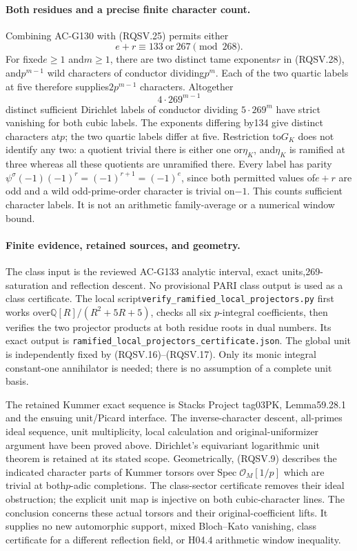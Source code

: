 \paragraph{Both residues and a precise finite character count.}
Combining AC-G130 with (RQSV.25) permits either
\[
                         e+r\equiv133\ \text{or}\ 267\pmod{268}.
 \tag{RQSV.28}
\]
For fixed$e\ge1$ and$m\ge1$, there are two distinct tame
exponents$r$ in (RQSV.28), and$p^{m-1}$ wild characters of
conductor dividing$p^m$.  Each of the two quartic labels at
five therefore supplies$2p^{m-1}$ characters.  Altogether
\[
                              4\cdot269^{m-1}
 \tag{RQSV.29}
\]
distinct sufficient Dirichlet labels of conductor dividing
$5\cdot269^m$ have strict vanishing for both cubic labels.
The exponents differing by134 give distinct characters at$p$;
the two quartic labels differ at five.  Restriction to$G_K$
does not identify any two: a quotient trivial there is either
one or$\eta_K$, and$\eta_K$ is ramified at three whereas all
these quotients are unramified there.
Every label has parity
$\psi^\sigma(-1)(-1)^r=(-1)^{r+1}=(-1)^e$,
since both permitted values of$e+r$ are odd and a wild
odd-prime-order character is trivial on$-1$.
This counts sufficient character labels.  It is not an
arithmetic family-average or a numerical window bound.

\paragraph{Finite evidence, retained sources, and geometry.}
The class input is the reviewed AC-G133 analytic interval,
exact units,269-saturation and reflection descent.  No
provisional PARI class output is used as a class certificate.
The local script\texttt{verify\_ramified\_local\_projectors.py}
first works over$\mathbb Q[R]/(R^2+5R+5)$, checks all six
$p$-integral coefficients, then verifies the two projector
products at both residue roots in dual numbers.
Its exact output is
\texttt{ramified\_local\_projectors\_certificate.json}.
The global unit is independently fixed by (RQSV.16)--(RQSV.17).
Only its monic integral constant-one annihilator is needed;
there is no assumption of a complete unit basis.

The retained Kummer exact sequence is Stacks Project tag03PK,
Lemma59.28.1 and the ensuing unit/Picard interface.  The
inverse-character descent, all-primes ideal sequence, unit
multiplicity, local calculation and original-uniformizer
argument have been proved above.  Dirichlet's equivariant
logarithmic unit theorem is retained at its stated scope.
Geometrically, (RQSV.9) describes the indicated character
parts of Kummer torsors over$\operatorname{Spec}\mathcal O_M[1/p]$
which are trivial at both$p$-adic completions.  The class-sector
certificate removes their ideal obstruction; the explicit
unit map is injective on both cubic-character lines.
The conclusion concerns these actual torsors and their
original-coefficient lifts.  It supplies no new automorphic
support, mixed Bloch--Kato vanishing, class certificate for a
different reflection field, or H04.4 arithmetic window inequality.

